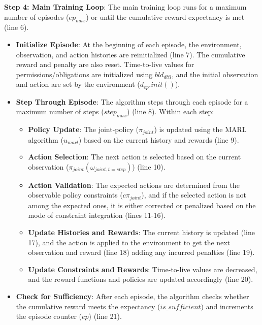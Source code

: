 \documentclass[runningheads]{llncs}
\theoremstyle{freethm}
\theoremstyle{proofoutline}
\begin{document}
\textbf{Step 4: Main Training Loop}: \quad
The main training loop runs for a maximum number of episodes ($ep_{max}$) or until the cumulative reward expectancy is met (line 6).

\begin{itemize}
    \item \textbf{Initialize Episode}:
          At the beginning of each episode, the environment, observation, and action histories are reinitialized (line 7). The cumulative reward and penalty are also reset. Time-to-live values for permissions/obligations are initialized using $bld_{dttl}$, and the initial observation and action are set by the environment ($d_{ep}.init()$).

    \item \textbf{Step Through Episode}:
          The algorithm steps through each episode for a maximum number of steps ($step_{max}$) (line 8). Within each step:

          \begin{itemize}
              \item \textbf{Policy Update}:
                    The joint-policy ($\pi_{joint}$) is updated using the MARL algorithm ($u_{marl}$) based on the current history and rewards (line 9).

              \item \textbf{Action Selection}:
                    The next action is selected based on the current observation ($\pi_{joint}(\omega_{joint,t=step})$) (line 10).

              \item \textbf{Action Validation}:
                    The expected actions are determined from the observable policy constraints ($c\pi_{joint}$), and if the selected action is not among the expected ones, it is either corrected or penalized based on the mode of constraint integration (lines 11-16).

              \item \textbf{Update Histories and Rewards}:
                    The current history is updated (line 17), and the action is applied to the environment to get the next observation and reward (line 18) adding any incurred penalties (line 19).

              \item \textbf{Update Constraints and Rewards}:
                    Time-to-live values are decreased, and the reward functions and policies are updated accordingly (line 20).
          \end{itemize}

    \item \textbf{Check for Sufficiency}:
          After each episode, the algorithm checks whether the cumulative reward meets the expectancy ($is\_sufficient$) and increments the episode counter ($ep$) (line 21).
\end{itemize}
\end{document}
